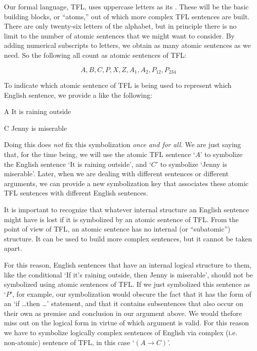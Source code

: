 Our formal language, TFL, uses uppercase letters as its . These will be the basic building blocks, or ``atoms,'' out of which more complex TFL sentences are built.  There are only twenty-six letters of the alphabet, but in principle there is no limit to the number of atomic sentences that we might want to consider. By adding numerical subscripts to letters, we obtain as many atomic sentences as we need.  So the following all count as atomic sentences of TFL:

	$$A, B, C, P, X, Z, A_1, A_2,  P_{12}, P_{234} $$

To indicate which atomic sentence of TFL is being used to represent which English sentence, we provide a  like the following:

	\begin{ekey}
		\item[A] It is raining outside
		\item[C] Jenny is miserable
	\end{ekey}

Doing this does \emph{not} fix this symbolization \emph{once and for all}. We are just saying that, for the time being, we will use the atomic TFL sentence `$A$' to symbolize the English sentence `It is raining outside', and `$C$' to symbolize `Jenny is miserable'. Later, when we are dealing with different sentences or different arguments, we can provide a new symbolization key that associates these atomic TFL sentences with different English sentences.


It is important to recognize that whatever internal structure an English sentence might have is lost if it is symbolized by an atomic sentence of TFL. From the point of view of TFL, an atomic sentence has no internal (or ``subatomic'') structure. It can be used to build more complex sentences, but it cannot be taken apart.

For this reason, English sentences that have an internal logical structure to them, like the conditional `If it's raining outside, then Jenny is miserable', should not be symbolized using atomic sentences of TFL.  If we just symbolized this sentence as `$P$', for example, our symbolization would obscure the fact that it has the form of an `if \ldots then \ldots' statement, and that it contains subsentences that also occur on their own as premise and conclusion in our argument  above. We would thefore miss out on the logical form in virtue of which argument  is valid.  For this reason we have to symbolize logically complex sentences of English via complex (i.e. non-atomic) sentence of TFL, in this case `$(A \rightarrow C)$'.  

